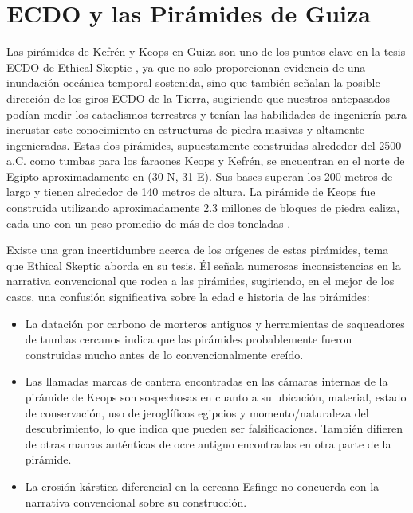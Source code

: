 \documentclass[10pt,twocolumn,letterpaper]{article}
\begin{document}
\section{ECDO y las Pirámides de Guiza}

Las pirámides de Kefrén y Keops en Guiza son uno de los puntos clave en la tesis ECDO de Ethical Skeptic \cite{27}, ya que no solo proporcionan evidencia de una inundación oceánica temporal sostenida, sino que también señalan la posible dirección de los giros ECDO de la Tierra, sugiriendo que nuestros antepasados podían medir los cataclismos terrestres y tenían las habilidades de ingeniería para incrustar este conocimiento en estructuras de piedra masivas y altamente ingenieradas. Estas dos pirámides, supuestamente construidas alrededor del 2500 a.C. como tumbas para los faraones Keops y Kefrén, se encuentran en el norte de Egipto aproximadamente en (30 N, 31 E). Sus bases superan los 200 metros de largo y tienen alrededor de 140 metros de altura. La pirámide de Keops fue construida utilizando aproximadamente 2.3 millones de bloques de piedra caliza, cada uno con un peso promedio de más de dos toneladas \cite{24, 25}.

Existe una gran incertidumbre acerca de los orígenes de estas pirámides, tema que Ethical Skeptic aborda en su tesis. Él señala numerosas inconsistencias en la narrativa convencional que rodea a las pirámides, sugiriendo, en el mejor de los casos, una confusión significativa sobre la edad e historia de las pirámides:

\begin{flushleft}
\begin{itemize}
    \item La datación por carbono de morteros antiguos y herramientas de saqueadores de tumbas cercanos indica que las pirámides probablemente fueron construidas mucho antes de lo convencionalmente creído.
    \item Las llamadas marcas de cantera encontradas en las cámaras internas de la pirámide de Keops son sospechosas en cuanto a su ubicación, material, estado de conservación, uso de jeroglíficos egipcios y momento/naturaleza del descubrimiento, lo que indica que pueden ser falsificaciones. También difieren de otras marcas auténticas de ocre antiguo encontradas en otra parte de la pirámide.
    \item La erosión kárstica diferencial en la cercana Esfinge no concuerda con la narrativa convencional sobre su construcción.
\end{itemize}
\end{flushleft}
\end{document}
